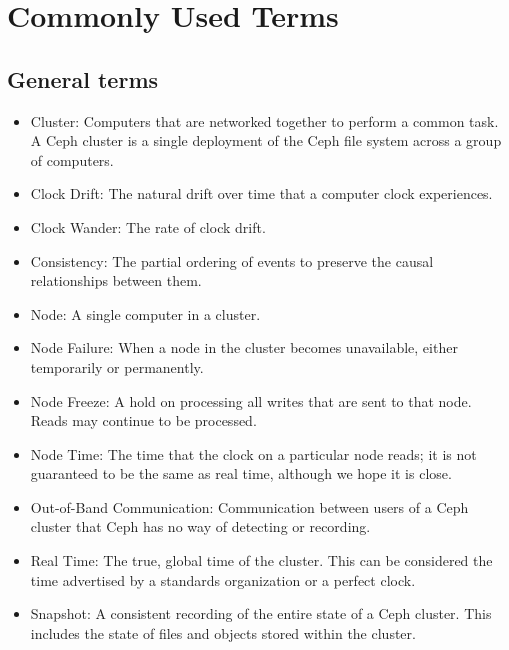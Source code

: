 \chapter{Commonly Used Terms}
\label{sec:terms}

\section{General terms}
\begin{itemize}
  \item Cluster: Computers that are networked together to perform a
    common task. A Ceph cluster is a single deployment of the Ceph
    file system across a group of computers. 
    
  \item Clock Drift: The natural drift over time that a computer
    clock experiences.
    
  \item Clock Wander: The rate of clock drift.

  \item Consistency: The partial ordering of events to preserve the
    causal relationships between them.
    
  \item Node: A single computer in a cluster.
  
  \item Node Failure: When a node in the cluster
    becomes unavailable, either temporarily or permanently.
      
  \item Node Freeze: A hold on processing all writes that are sent to
    that node. Reads may continue to be processed.
    
  \item Node Time: The time that the clock on a particular node reads;
    it is not guaranteed to be the same as real time, although we hope it is
    close.
    
  \item Out-of-Band Communication: Communication between users of a
    Ceph cluster that Ceph has no way of detecting or recording.
    
  \item Real Time: The true, global time of the cluster. This can be considered
  the time advertised by a standards organization or a perfect clock.

  \item Snapshot: A consistent recording of the entire state of a Ceph cluster. 
  This includes the state of files and objects stored within the cluster.
    

\end{itemize}
